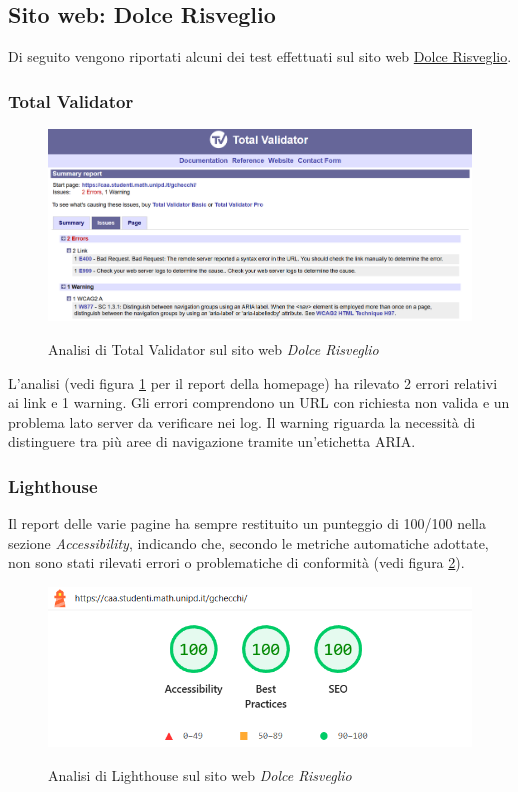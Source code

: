 \subsection{Sito web: Dolce Risveglio}
\noindent Di seguito vengono riportati alcuni dei test effettuati sul sito web \href{https://caa.studenti.math.unipd.it/gchecchi/}{Dolce Risveglio}.

\subsubsection{Total Validator}
\begin{figure}[H]
    \centering
    \includegraphics[width=0.9\linewidth, alt={Screenshot dell'analisi di Total Validator sul sito web Dolce Risveglio}]{img/TV_dolcerisveglio.png}
    \caption{Analisi di Total Validator sul sito web \textit{Dolce Risveglio}}\label{fig:TV_dolcerisveglio}
\end{figure}

\noindent L'analisi (vedi figura \ref{fig:TV_dolcerisveglio} per il report della homepage) ha rilevato 2 errori relativi ai link e 1 warning. 
Gli errori comprendono un URL con richiesta non valida e un problema lato server da verificare nei log. 
Il warning riguarda la necessità di distinguere tra più aree di navigazione tramite un'etichetta ARIA. 

\subsubsection{Lighthouse}
\noindent Il report delle varie pagine ha sempre restituito un punteggio di 100/100 nella sezione \textit{Accessibility}, indicando che, secondo le metriche automatiche adottate, non sono stati rilevati errori o problematiche di conformità (vedi figura \ref{fig:Lighthouse_dolcerisveglio}).
\begin{figure}[H]
    \centering
    \includegraphics[width=0.6\linewidth, alt={Screenshot dell'analisi di Lighthouse sul sito web DolceRisveglio}]{img/Lighthouse_dolcerisveglio.png}
    \caption{Analisi di Lighthouse sul sito web \textit{Dolce Risveglio}}\label{fig:Lighthouse_dolcerisveglio}
\end{figure}

